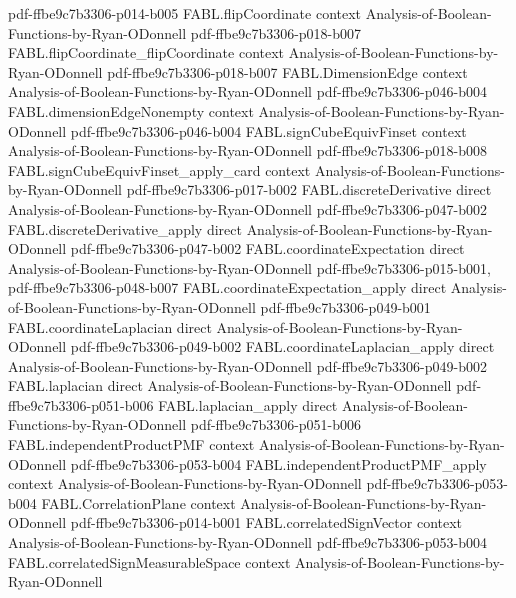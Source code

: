 \begin{theorem}
  {pdf-ffbe9c7b3306-p014-b005}
\proofstep
  {FABL.flipCoordinate}
  {context}
  {Analysis-of-Boolean-Functions-by-Ryan-ODonnell}
  {pdf-ffbe9c7b3306-p018-b007}
\proofstep
  {FABL.flipCoordinate_flipCoordinate}
  {context}
  {Analysis-of-Boolean-Functions-by-Ryan-ODonnell}
  {pdf-ffbe9c7b3306-p018-b007}
\proofstep
  {FABL.DimensionEdge}
  {context}
  {Analysis-of-Boolean-Functions-by-Ryan-ODonnell}
  {pdf-ffbe9c7b3306-p046-b004}
\proofstep
  {FABL.dimensionEdgeNonempty}
  {context}
  {Analysis-of-Boolean-Functions-by-Ryan-ODonnell}
  {pdf-ffbe9c7b3306-p046-b004}
\proofstep
  {FABL.signCubeEquivFinset}
  {context}
  {Analysis-of-Boolean-Functions-by-Ryan-ODonnell}
  {pdf-ffbe9c7b3306-p018-b008}
\proofstep
  {FABL.signCubeEquivFinset_apply_card}
  {context}
  {Analysis-of-Boolean-Functions-by-Ryan-ODonnell}
  {pdf-ffbe9c7b3306-p017-b002}
\proofstep
  {FABL.discreteDerivative}
  {direct}
  {Analysis-of-Boolean-Functions-by-Ryan-ODonnell}
  {pdf-ffbe9c7b3306-p047-b002}
\proofstep
  {FABL.discreteDerivative_apply}
  {direct}
  {Analysis-of-Boolean-Functions-by-Ryan-ODonnell}
  {pdf-ffbe9c7b3306-p047-b002}
\proofstep
  {FABL.coordinateExpectation}
  {direct}
  {Analysis-of-Boolean-Functions-by-Ryan-ODonnell}
  {pdf-ffbe9c7b3306-p015-b001,
    pdf-ffbe9c7b3306-p048-b007}
\proofstep
  {FABL.coordinateExpectation_apply}
  {direct}
  {Analysis-of-Boolean-Functions-by-Ryan-ODonnell}
  {pdf-ffbe9c7b3306-p049-b001}
\proofstep
  {FABL.coordinateLaplacian}
  {direct}
  {Analysis-of-Boolean-Functions-by-Ryan-ODonnell}
  {pdf-ffbe9c7b3306-p049-b002}
\proofstep
  {FABL.coordinateLaplacian_apply}
  {direct}
  {Analysis-of-Boolean-Functions-by-Ryan-ODonnell}
  {pdf-ffbe9c7b3306-p049-b002}
\proofstep
  {FABL.laplacian}
  {direct}
  {Analysis-of-Boolean-Functions-by-Ryan-ODonnell}
  {pdf-ffbe9c7b3306-p051-b006}
\proofstep
  {FABL.laplacian_apply}
  {direct}
  {Analysis-of-Boolean-Functions-by-Ryan-ODonnell}
  {pdf-ffbe9c7b3306-p051-b006}
\proofstep
  {FABL.independentProductPMF}
  {context}
  {Analysis-of-Boolean-Functions-by-Ryan-ODonnell}
  {pdf-ffbe9c7b3306-p053-b004}
\proofstep
  {FABL.independentProductPMF_apply}
  {context}
  {Analysis-of-Boolean-Functions-by-Ryan-ODonnell}
  {pdf-ffbe9c7b3306-p053-b004}
\proofstep
  {FABL.CorrelationPlane}
  {context}
  {Analysis-of-Boolean-Functions-by-Ryan-ODonnell}
  {pdf-ffbe9c7b3306-p014-b001}
\proofstep
  {FABL.correlatedSignVector}
  {context}
  {Analysis-of-Boolean-Functions-by-Ryan-ODonnell}
  {pdf-ffbe9c7b3306-p053-b004}
\proofstep
  {FABL.correlatedSignMeasurableSpace}
  {context}
  {Analysis-of-Boolean-Functions-by-Ryan-ODonnell}

\end{theorem}
